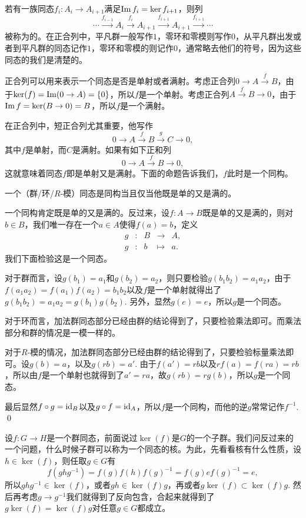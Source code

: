\para 若有一族同态$f_i:A_i\to A_{i+1}$满足$\operatorname{Im} f_i=\ker f_{i+1}$，则列
\[
	\cdots \xrightarrow{f_{i-1}}A_i \xrightarrow{f_i} A_{i+1} \xrightarrow{f_{i+1}} A_{i+1}\xrightarrow{f_{i+1}}\cdots
\]
被称为的。在正合列中，平凡群一般写作$1$，零环和零模则写作$0$，从平凡群出发或者到平凡群的同态记作$1$，零环和零模的则记作$0$，通常略去他们的符号，因为这些同态的我们是清楚的。

正合列可以用来表示一个同态是否是单射或者满射。考虑正合列$0\to A\xrightarrow{f} B$，由于$\ker(f)=\operatorname{Im}(0\to A)=\{0\}$，所以$f$是一个单射。考虑正合列$A\xrightarrow{f} B\to 0$，由于$\operatorname{Im} f=\ker(B\to 0)=B$，所以$f$是一个满射。

在正合列中，短正合列尤其重要，他写作
\[
	0\to A \xrightarrow{f} B \xrightarrow{g} C\to 0,
\]
其中$f$是单射，而$C$是满射。如果有如下正和列
\[
	0\to A \xrightarrow{f} B \to 0,
\]
这就意味着同态$f$即是单射又是满射。下面的命题告诉我们，$f$此时是一个同构。

\pro 一个（群/环/$R$-模）同态是同构当且仅当他既是单的又是满的。

\proof 一个同构肯定既是单的又是满的。反过来，设$f: A\to B$既是单的又是满的，则对$b\in B$，我们唯一存在一个$a\in A$使得$f(a)=b$，定义
\[
	\begin{array}{ccccc}
		g &:&B &\to& A,\\
		g &:&b &\mapsto& a.
	\end{array}
\]
我们下面检验这是一个同态。

对于群而言，设$g(b_1)=a_1$和$g(b_2)=a_2$，则只要检验$g(b_1b_2)=a_1a_2$，由于$f(a_1a_2)=f(a_1)f(a_2)=b_1b_2$以及$f$是一个单射就得出了$g(b_1b_2)=a_1a_2=g(b_1)g(b_2)$. 另外，显然$g(e)=e$，所以$g$是一个同态。

对于环而言，加法群同态部分已经由群的结论得到了，只要检验乘法即可。而乘法部分和群的情况是一模一样的。

对于$R$-模的情况，加法群同态部分已经由群的结论得到了，只要检验标量乘法即可。设$g(b)=a$，以及$g(rb)=a'$. 由于$f(a')=rb$以及$rf(a)=f(ra)=rb$，所以由$f$是一个单射也就得到了$a'=ra$，故$g(rb)=rg(b)$，所以$g$是一个同态。

最后显然$f\circ g =\operatorname{id}_B$以及$g\circ f=\operatorname{id}_A$，所以$f$是一个同构，而他的逆$g$常常记作$f^{-1}$.
\qed

\para 设$f:G\to H$是一个群同态，前面说过$\ker(f)$是$G$的一个子群。我们问反过来的一个问题，什么时候子群可以称为一个同态的核。为此，先看看核有什么性质，设$h\in \ker(f)$，则任取$g\in G$有
\[
	f\left(ghg^{-1}\right)=f(g)f(h)f(g)^{-1}=f(g)ef(g)^{-1}=e,
\]
所以$ghg^{-1}\in \ker(f)$，或者$gh \in \ker(f)g$，再或者$g\ker(f)\subset \ker(f)g$. 然后再考虑$g\to g^{-1}$我们就得到了反向包含，合起来就得到了$g\ker(f)=\ker(f)g$对任意$g\in G$都成立。

